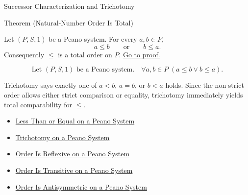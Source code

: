 \begin{topicbox}{Successor Characterization and Trichotomy}
\begin{theorembox}{Theorem (Natural-Number Order Is Total)}
\begin{theorem}
\label{thm:natural-number-order-is-total}
Let $(P,S,1)$ be a Peano system. For every $a,b \in P$,
\[
a \le b
\qquad\text{or}\qquad
b \le a.
\]
Consequently $\le$ is a total order on $P$.
\hyperref[prf:natural-number-order-is-total]{Go to proof.}
\end{theorem}
\end{theorembox}

\begin{remark*}
\[
\text{Let } (P,S,1) \text{ be a Peano system.}\quad
\forall a,b \in P\;(a \le b \lor b \le a).
\]
\end{remark*}

\begin{remark*}[Interpretation]
Trichotomy says exactly one of $a<b$, $a=b$, or $b<a$ holds. Since the
non-strict order allows either strict comparison or equality, trichotomy
immediately yields total comparability for $\le$.
\end{remark*}

\begin{dependencies}
\begin{itemize}
  \item \hyperref[def:less-than-or-equal-on-peano-system]{Less Than or Equal on a Peano System}
  \item \hyperref[thm:trichotomy-on-peano-system]{Trichotomy on a Peano System}
  \item \hyperref[thm:order-reflexive-on-peano-system]{Order Is Reflexive on a Peano System}
  \item \hyperref[thm:order-transitive-on-peano-system]{Order Is Transitive on a Peano System}
  \item \hyperref[thm:order-antisymmetric-on-peano-system]{Order Is Antisymmetric on a Peano System}
\end{itemize}
\end{dependencies}
\end{topicbox}
